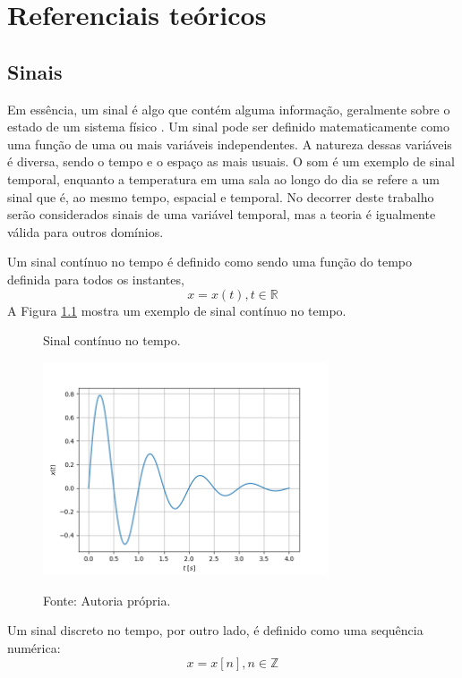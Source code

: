 \documentclass[12pt,a4paper]{report}
\begin{document}
\chapter{Referenciais teóricos}
\section{Sinais}
  Em essência, um sinal é algo que contém alguma informação, geralmente sobre o estado de um sistema físico
  \cite{oppenheim}. Um sinal pode ser definido matematicamente como uma função de uma ou mais variáveis
  independentes. A natureza dessas variáveis é diversa, sendo o tempo e o espaço as mais usuais. O som é um
  exemplo de sinal temporal, enquanto a temperatura em uma sala ao longo do dia se refere a um sinal que é,
  ao mesmo tempo, espacial e temporal. No decorrer deste trabalho serão considerados sinais de uma variável
  temporal, mas a teoria é igualmente válida para outros domínios.

  Um sinal contínuo no tempo é definido como sendo uma função do tempo definida para todos os instantes,
  \begin{equation}
    x = x(t), t \in \mathbb{R}
  \end{equation}
  A Figura \ref{fig:continuous} mostra um exemplo de sinal contínuo no tempo.
  \begin{figure}[H]
    \caption{Sinal contínuo no tempo.}
    \centering
    \includegraphics[width=0.75\textwidth]{continuous}
    \label{fig:continuous}
    \caption*{Fonte: Autoria própria.}
  \end{figure}

  Um sinal discreto no tempo, por outro lado, é definido como uma sequência numérica:
  \begin{equation}
    x = x[n], n \in \mathbb{Z}
  \end{equation}
\end{document}
